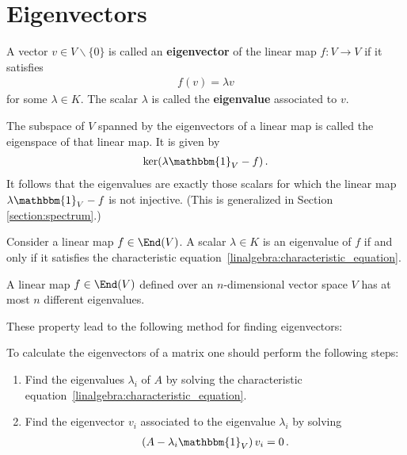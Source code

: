 \section{Eigenvectors}

    \begin{definition}[Eigenvector]
        A vector $v\in V\backslash\{0\}$ is called an \textbf{eigenvector} of the linear map $f:V\rightarrow V$ if it satisfies
       \begin{gather}
            f(v) = \lambda v
        \end{gather}
       for some $\lambda\in K$. The scalar $\lambda$ is called the \textbf{eigenvalue} associated to $v$.
    \end{definition}
    \begin{definition}[Eigenspace]\label{linalgebra:eigenvalue_remark}
        The subspace of $V$ spanned by the eigenvectors of a linear map is called the eigenspace of that linear map. It is given by
        \begin{gather}
            \ker(\lambda\mathbbm{1}_V - f)\,.
        \end{gather}
        It follows that the eigenvalues are exactly those scalars for which the linear map $\lambda\mathbbm{1}_V-f$ is not injective. (This is generalized in Section \ref{section:spectrum}.)
    \end{definition}

    \begin{property}\label{linalgebra:eigenvalue_characteristic_equation}
        Consider a linear map $f\in\End(V)$. A scalar $\lambda\in K$ is an eigenvalue of $f$ if and only if it satisfies the characteristic equation~\eqref{linalgebra:characteristic_equation}.
    \end{property}
    \begin{property}
        A linear map $f\in\End(V)$ defined over an $n$-dimensional vector space $V$ has at most $n$ different eigenvalues.
    \end{property}

    These property lead to the following method for finding eigenvectors:
    \begin{method}
        To calculate the eigenvectors of a matrix one should perform the following steps:
        \begin{enumerate}
            \item Find the eigenvalues $\lambda_i$ of $A$ by solving the characteristic equation~\eqref{linalgebra:characteristic_equation}.
            \item Find the eigenvector $v_i$ associated to the eigenvalue $\lambda_i$ by solving
                \begin{gather}
                    \label{linalgebra:eigenspace}
                    \left(A - \lambda_i\mathbbm{1}_V\right)v_i = 0\,.
                \end{gather}
        \end{enumerate}
    \end{method}

